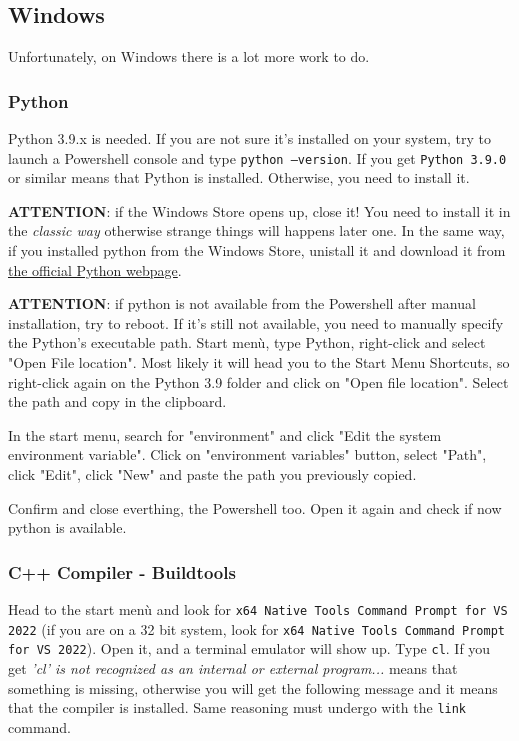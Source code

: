 \subsection{Windows}
Unfortunately, on Windows there is a lot more work to do.

\subsubsection{Python}
Python 3.9.x is needed. If you are not sure it's installed on your system, try to launch a Powershell console and type \texttt{python --version}. If you get \texttt{Python 3.9.0} or similar means that Python is installed. Otherwise, you need to install it. \\

\begin{warning}
	\textbf{ATTENTION}: if the Windows Store opens up, close it! You need to install it in the \textit{classic way} otherwise strange things will happens later one. In the same way, if you installed python from the Windows Store, unistall it and download it from \href{https://www.python.org/downloads/release/python-390/}{the official Python webpage}.
\end{warning}

\newpage
\begin{warning}
	\textbf{ATTENTION}: if python is not available from the Powershell after manual installation, try to reboot. If it's still not available, you need to manually specify the Python's executable path. Start menù, type Python, right-click and select "Open File location". Most likely it will head you to the Start Menu Shortcuts, so right-click again on the Python 3.9 folder and click on "Open file location". Select the path and copy in the clipboard.

	In the start menu, search for "environment" and click "Edit the system environment variable". Click on "environment variables" button, select "Path", click "Edit", click "New" and paste the path you previously copied.

	Confirm and close everthing, the Powershell too. Open it again and check if now python is available.
\end{warning}

\subsubsection{C++ Compiler - Buildtools}
Head to the start menù and look for \texttt{x64 Native Tools Command Prompt for VS 2022} (if you are on a 32 bit system, look for \texttt{x64 Native Tools Command Prompt for VS 2022}). Open it, and a terminal emulator will show up. Type \texttt{cl}. If you get \textit{'cl' is not recognized as an internal or external program...} means that something is missing, otherwise you will get the following message and it means that the compiler is installed. Same reasoning must undergo with the \texttt{link} command.

